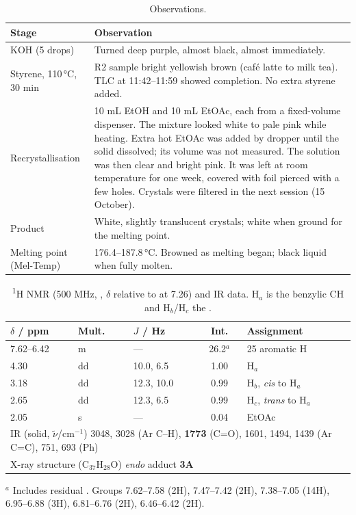 \documentclass[11pt,a4paper]{article}
\begin{document}
\begin{table}[H]
\centering
\caption{Observations.}
\label{tab:obs}
\small
\begin{tabularx}{\linewidth}{lX}
\toprule
Stage & Observation \\
\midrule
KOH (5 drops) & Turned deep purple, almost black, almost immediately. \\
Styrene, 110\,\si{\celsius}, 30 min & R2 sample bright yellowish brown (caf\'e latte to milk tea). TLC at 11:42--11:59 showed completion. No extra styrene added. \\
Recrystallisation & 10 mL EtOH and 10 mL EtOAc, each from a fixed-volume dispenser. The mixture looked white to pale pink while heating. Extra hot EtOAc was added by dropper until the solid dissolved; its volume was not measured. The solution was then clear and bright pink. It was left at room temperature for one week, covered with foil pierced with a few holes. Crystals were filtered in the next session (15 October). \\
Product & White, slightly translucent crystals; white when ground for the melting point. \\
Melting point (Mel-Temp) & 176.4--187.8\,\si{\celsius}. Browned as melting began; black liquid when fully molten. \\
\bottomrule
\end{tabularx}
\end{table}

\begin{table}[H]
\centering
\caption{\textsuperscript{1}H NMR (500 MHz, , $\delta$ relative to  at 7.26)\cite{Fulmer2010} and IR data. H$_a$ is the benzylic CH and H$_b$/H$_c$ the .}
\label{tab:nmr}
\small
\begin{tabular}{lllcl}
\toprule
$\delta$ / ppm & Mult. & $J$ / Hz & Int. & Assignment \\
\midrule
7.62--6.42 & m & --- & 26.2$^{a}$ & 25 aromatic H \\
4.30 & dd & 10.0, 6.5 & 1.00 & H$_a$ \\
3.18 & dd & 12.3, 10.0 & 0.99 & H$_b$, \emph{cis} to H$_a$ \\
2.65 & dd & 12.3, 6.5 & 0.99 & H$_c$, \emph{trans} to H$_a$ \\
2.05 & s & --- & 0.04 & EtOAc \\
\midrule
\multicolumn{5}{l}{IR (solid, $\tilde{\nu}$/cm$^{-1}$) 3048, 3028 (Ar C--H), \textbf{1773} (C=O), 1601, 1494, 1439 (Ar C=C), 751, 693 (Ph)} \\
\multicolumn{5}{l}{X-ray structure (C$_{37}$H$_{28}$O) \emph{endo} adduct \textbf{3A}} \\
\bottomrule
\end{tabular}

\smallskip
\begin{minipage}{0.9\linewidth}\footnotesize
$^{a}$ Includes residual . Groups 7.62--7.58 (2H), 7.47--7.42 (2H), 7.38--7.05 (14H), 6.95--6.88 (3H), 6.81--6.76 (2H), 6.46--6.42 (2H).
\end{minipage}
\end{table}
\end{document}
